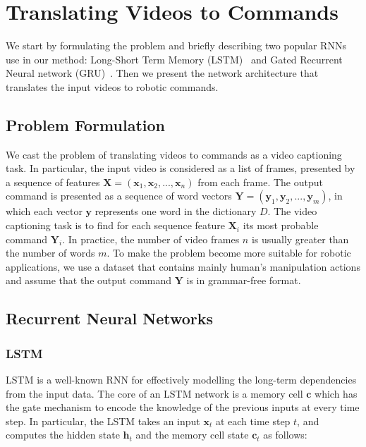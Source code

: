 \section{Translating Videos to Commands} \label{Sec:rnn}
We start by formulating the problem and briefly describing two popular RNNs use in our method: Long-Short Term Memory (LSTM)~\cite{Hochreiter97_LSTM} and Gated Recurrent Neural network (GRU)~\cite{Cho14_GRU}. Then we present the network architecture that translates the input videos to robotic commands.

\subsection{Problem Formulation}
We cast the problem of translating videos to commands as a video captioning task. In particular, the input video is considered as a list of frames, presented by a sequence of features  $\mathbf{X} = (\mathbf{x}_1, \mathbf{x}_2, ..., \mathbf{x}_n)$ from each frame. The output command is presented as a sequence of word vectors $\mathbf{Y}=(\mathbf{y}_1, \mathbf{y}_2, ..., \mathbf{y}_m)$, in which each vector $\mathbf{y}$ represents one word in the dictionary $D$. The video captioning task is to find for each sequence feature $\mathbf{X}_i$ its most probable command $\mathbf{Y}_i$. In practice, the number of video frames $n$ is usually greater than the number of words $m$. To make the problem become more suitable for robotic applications, we use a dataset that contains mainly human's manipulation actions and assume that the output command $\mathbf{Y}$ is in grammar-free format.




\subsection{Recurrent Neural Networks}

\subsubsection{LSTM}
LSTM is a well-known RNN for effectively modelling the long-term dependencies from the input data. The core of an LSTM network is a memory cell $\mathbf{c}$ which has the gate mechanism to encode the knowledge of the previous inputs at every time step. In particular, the LSTM takes an input $\mathbf{x}_t$ at each time step $t$, and computes the hidden state $\mathbf{h}_t$ and the memory cell state $\mathbf{c}_t$ as follows:


